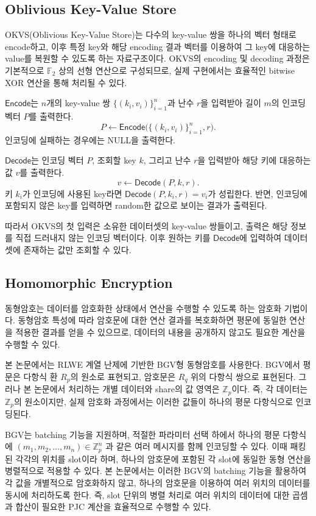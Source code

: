 \documentclass[sigconf,anonymous,review]{acmart}
\begin{document}
\subsection{Oblivious Key-Value Store}\label{sec:okvs}
OKVS(Oblivious Key-Value Store)는 다수의 key-value 쌍을 하나의 벡터 형태로 encode하고, 이후 특정 key와 해당 encoding 결과 벡터를 이용하여 그 key에 대응하는 value를 복원할 수 있도록 하는 자료구조이다. OKVS의 encoding 및 decoding 과정은 기본적으로 $\mathbb{F}_2$ 상의 선형 연산으로 구성되므로, 실제 구현에서는 효율적인 bitwise XOR 연산을 통해 처리될 수 있다.

\(\mathsf{Encode}\)는 \(n\)개의 key-value
쌍
\(\{(k_i,v_i)\}_{i=1}^{n}\)과 난수 $r$을 입력받아 길이 \(m\)의
인코딩 벡터 \(P\)를 출력한다.
\[
P\leftarrow
\mathsf{Encode}\bigl(\{(k_i,v_i)\}_{i=1}^{n},r\bigr).
\]
인코딩에 실패하는 경우에는 NULL을 출력한다.

\(\mathsf{Decode}\)는 인코딩 벡터 \(P\), 조회할 key \(k\), 그리고
난수 $r$을 입력받아 해당 키에 대응하는 값 \(v\)를 출력한다.
\[
v\leftarrow\mathsf{Decode}(P,k,r).
\]
키 \(k_i\)가 인코딩에 사용된 key라면 \(\mathsf{Decode}(P,k_i,r)=v_i\)가
성립한다. 반면, 인코딩에 포함되지 않은 key를 입력하면 random한 값으로 보이는 결과가 출력된다.

따라서 OKVS의 첫 입력은 소유한 데이터셋의 key-value 쌍들이고, 출력은 해당 정보를
직접 드러내지 않는 인코딩 벡터이다. 이후 원하는 키를
\(\mathsf{Decode}\)에 입력하여 데이터셋에 존재하는 값만 조회할 수 있다.


\subsection{Homomorphic Encryption}\label{sec:he}
동형암호는 데이터를 암호화한 상태에서 연산을 수행할 수 있도록 하는 암호화 기법이다. 동형암호 특성에 따라 암호문에 대한 연산 결과를 복호화하면 평문에 동일한 연산을 적용한 결과를 얻을 수 있으므로, 데이터의 내용을 공개하지 않고도 필요한 계산을 수행할 수 있다.

본 논문에서는 RLWE 계열 난제에 기반한 BGV형 동형암호를 사용한다. BGV에서 평문은 다항식 환 \(R_p\)의 원소로 표현되고, 암호문은 \(R_q\) 위의 다항식 쌍으로 표현된다. 그러나 본 논문에서 처리하는 개별 데이터와 share의 값 영역은 \(\mathbb{Z}_p\)이다. 즉, 각 데이터는 \(\mathbb{Z}_p\)의 원소이지만, 실제 암호화 과정에서는 이러한 값들이 하나의 평문 다항식으로 인코딩된다.

BGV는 batching 기능을 지원하며, 적절한 파라미터 선택 하에서 하나의 평문 다항식에
$
    (m_1, m_2, \ldots, m_n) \in \mathbb{Z}_p^n
$
과 같은 여러 메시지를 함께 인코딩할 수 있다. 이때 패킹된 각각의 위치를 slot이라 하며, 하나의 암호문에 포함된 각 slot에 동일한 동형 연산을 병렬적으로 적용할 수 있다. 본 논문에서는 이러한 BGV의 batching 기능을 활용하여 각 값을 개별적으로 암호화하지 않고, 하나의 암호문을 이용하여 여러 위치의 데이터를 동시에 처리하도록 한다. 즉, slot 단위의 병렬 처리로 여러 위치의 데이터에 대한 곱셈과 합산이 필요한 PJC 계산을 효율적으로 수행할 수 있다. 
\end{document}
